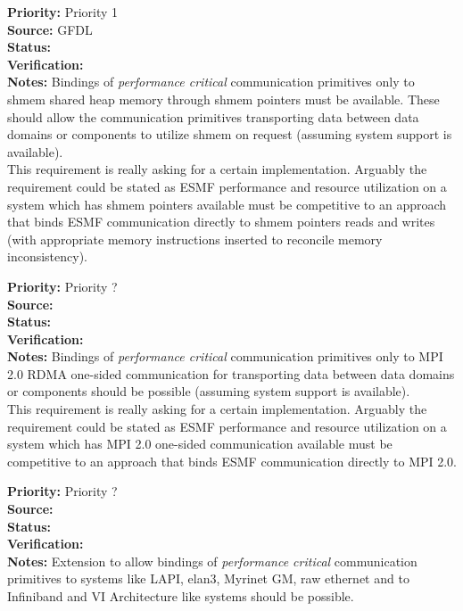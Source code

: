 \begin{reqlist}
{\bf Priority:} Priority 1 \\
{\bf Source:}  GFDL \\
{\bf Status:}  \\
{\bf Verification:} \\
{\bf Notes:} Bindings of {\it performance critical} communication primitives only
to shmem shared heap memory through shmem pointers must be available. These 
should allow the communication primitives transporting data between data domains 
or components to utilize shmem on request (assuming system support
is available).\\
This requirement is really asking for a certain implementation.
Arguably the requirement could be stated as ESMF performance
and resource utilization on a system which has shmem pointers available must be
competitive to an approach that binds ESMF communication directly to shmem pointers
reads and writes (with appropriate memory
instructions inserted to reconcile memory inconsistency).
\end{reqlist}

\begin{reqlist}
{\bf Priority:} Priority ? \\
{\bf Source:}  \\
{\bf Status:}  \\
{\bf Verification:} \\
{\bf Notes:} Bindings of {\it performance critical} communication primitives only
to MPI 2.0 RDMA one-sided communication for transporting data between data domains 
or components should be possible (assuming system support
is available).\\
This requirement is really asking for a certain implementation.
Arguably the requirement could be stated as ESMF performance
and resource utilization on a system which has MPI 2.0 one-sided communication available must be
competitive to an approach that binds ESMF communication directly to MPI 2.0.
\end{reqlist}

\begin{reqlist}
{\bf Priority:} Priority ? \\
{\bf Source:}  \\
{\bf Status:}  \\
{\bf Verification:} \\
{\bf Notes:} Extension to allow bindings of {\it performance critical} communication primitives to
systems like LAPI, elan3, Myrinet GM, raw ethernet and to Infiniband and VI Architecture like systems should be 
possible.
\end{reqlist}



